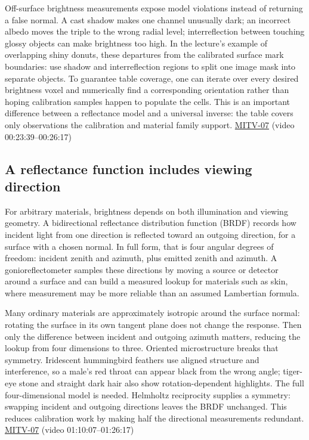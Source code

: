 Off-surface brightness measurements expose model violations instead of returning a false normal. A cast shadow makes one channel unusually dark; an incorrect albedo moves the triple to the wrong radial level; interreflection between touching glossy objects can make brightness too high. In the lecture's example of overlapping shiny donuts, these departures from the calibrated surface mark boundaries: use shadow and interreflection regions to split one image mask into separate objects. To guarantee table coverage, one can iterate over every desired brightness voxel and numerically find a corresponding orientation rather than hoping calibration samples happen to populate the cells. This is an important difference between a reflectance model and a universal inverse: the table covers only observations the calibration and material family support. \hyperref[04-visual-computing-ii-ch036-mitv-07---gradient-space-reflectance-map-image-irradiance-equation-gnomonic-projection]{MITV-07} (video 00:23:39--00:26:17)

\subsection{A reflectance function includes viewing direction}\label{04-visual-computing-ii-ch032-a-reflectance-function-includes-viewing-direction}

For arbitrary materials, brightness depends on both illumination and viewing geometry. A bidirectional reflectance distribution function (BRDF) records how incident light from one direction is reflected toward an outgoing direction, for a surface with a chosen normal. In full form, that is four angular degrees of freedom: incident zenith and azimuth, plus emitted zenith and azimuth. A gonioreflectometer samples these directions by moving a source or detector around a surface and can build a measured lookup for materials such as skin, where measurement may be more reliable than an assumed Lambertian formula.

Many ordinary materials are approximately isotropic around the surface normal: rotating the surface in its own tangent plane does not change the response. Then only the difference between incident and outgoing azimuth matters, reducing the lookup from four dimensions to three. Oriented microstructure breaks that symmetry. Iridescent hummingbird feathers use aligned structure and interference, so a male's red throat can appear black from the wrong angle; tiger-eye stone and straight dark hair also show rotation-dependent highlights. The full four-dimensional model is needed. Helmholtz reciprocity supplies a symmetry: swapping incident and outgoing directions leaves the BRDF unchanged. This reduces calibration work by making half the directional measurements redundant. \hyperref[04-visual-computing-ii-ch036-mitv-07---gradient-space-reflectance-map-image-irradiance-equation-gnomonic-projection]{MITV-07} (video 01:10:07--01:26:17)

